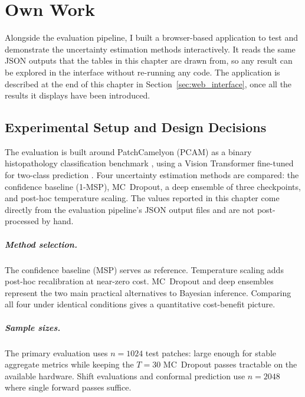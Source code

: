 \chapter{Own Work}
\label{chap:own_work}

Alongside the evaluation pipeline, I built a browser-based application to test and demonstrate the uncertainty estimation methods interactively. It reads the same JSON outputs that the tables in this chapter are drawn from, so any result can be explored in the interface without re-running any code. The application is described at the end of this chapter in Section~\ref{sec:web_interface}, once all the results it displays have been introduced.

\section{Experimental Setup and Design Decisions}
\label{sec:setup}

The evaluation is built around PatchCamelyon (PCAM) as a binary histopathology classification benchmark \cite{veeling2018rotation,pcamchallenge}, using a Vision Transformer fine-tuned for two-class prediction \cite{dosovitskiy2021image}. Four uncertainty estimation methods are compared: the confidence baseline (1-MSP), MC~Dropout, a deep ensemble of three checkpoints, and post-hoc temperature scaling. The values reported in this chapter come directly from the evaluation pipeline's JSON output files and are not post-processed by hand.

\paragraph{Method selection.} The confidence baseline (MSP) serves as reference. Temperature scaling adds post-hoc recalibration at near-zero cost. MC~Dropout and deep ensembles represent the two main practical alternatives to Bayesian inference. Comparing all four under identical conditions gives a quantitative cost-benefit picture.


\paragraph{Sample sizes.} The primary evaluation uses $n = 1024$ test patches: large enough for stable aggregate metrics while keeping the $T = 30$ MC~Dropout passes tractable on the available hardware. Shift evaluations and conformal prediction use $n = 2048$ where single forward passes suffice.

